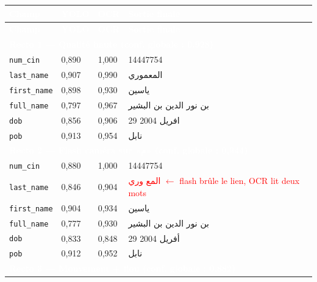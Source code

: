 \renewcommand{\arraystretch}{1.25}
\setlength{\LTleft}{0pt plus 1fill}
\setlength{\LTright}{0pt plus 1fill}
\begin{longtable}{|p{3cm}|p{1.8cm}|p{1.8cm}|p{7.5cm}|}
  \rowcolor{bleu_principal}
  \textcolor{white}{\textbf{Champ}} &
  \textcolor{white}{\textbf{YOLO}} &
  \textcolor{white}{\textbf{OCR}} &
  \textcolor{white}{\textbf{Sortie finale}} \\
  \hline
  \endfirsthead
  \rowcolor{bleu_principal}
  \textcolor{white}{\textbf{Champ}} &
  \textcolor{white}{\textbf{YOLO}} &
  \textcolor{white}{\textbf{OCR}} &
  \textcolor{white}{\textbf{Sortie finale}} \\
  \hline
  \endhead
  \multicolumn{4}{|p{14.2cm}|}{\cellcolor{bleu_principal}\textcolor{white}{\textbf{Recto 1 --- Qualité haute (conf. globale : 0,928)}}} \\ \hline
  \texttt{num\_cin}    & 0,890 & 1,000 & 14447754 \\ \hline
  \texttt{last\_name}  & 0,907 & 0,990 & \textarabic{المعموري} \\ \hline
  \texttt{first\_name} & 0,898 & 0,930 & \textarabic{ياسين} \\ \hline
  \texttt{full\_name}  & 0,797 & 0,967 & \textarabic{بن نور الدين بن البشير} \\ \hline
  \texttt{dob}         & 0,856 & 0,906 & \textarabic{29 افريل 2004} \\ \hline
  \texttt{pob}         & 0,913 & 0,954 & \textarabic{نابل} \\ \hline
  \multicolumn{4}{|p{14.2cm}|}{\cellcolor{bleu_principal}\textcolor{white}{\textbf{Recto 2 --- Flash caméra sur «م» (conf. globale : 0,944)}}} \\ \hline
  \texttt{num\_cin}    & 0,880 & 1,000 & 14447754 \\ \hline
  \texttt{last\_name}  & 0,846 & 0,904 & \textcolor{red}{\textarabic{المع وري}} \textcolor{red}{\small$\leftarrow$ flash brûle le lien, OCR lit deux mots} \\ \hline
  \texttt{first\_name} & 0,904 & 0,934 & \textarabic{ياسين} \\ \hline
  \texttt{full\_name}  & 0,777 & 0,930 & \textarabic{بن نور الدين بن البشير} \\ \hline
  \texttt{dob}         & 0,833 & 0,848 & \textarabic{29 أفريل 2004} \\ \hline
  \texttt{pob}         & 0,912 & 0,952 & \textarabic{نابل} \\ \hline
  \multicolumn{4}{|p{14.2cm}|}{\cellcolor{bleu_principal}\textcolor{white}{\textbf{Recto 3 --- Mouvement + flou (conf. globale : 0,882)}}} \\ \hline

\end{longtable}
